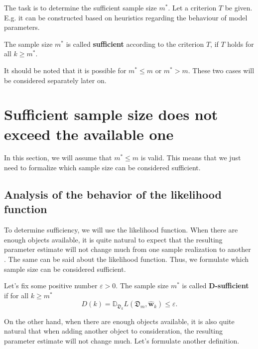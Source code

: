 \documentclass[
11pt,%
tightenlines,%
twoside,%
onecolumn,%
nofloats,%
nobibnotes,%
nofootinbib,%
superscriptaddress,%
noshowpacs,%
centertags]%
{revtex4-2}
\begin{document}
The task is to determine the sufficient sample size $m^*$. Let a criterion $T$ be given. E.g. it can be constructed based on heuristics regarding the behaviour of model parameters.
\begin{definition}
    The sample size $m^*$ is called \textbf{sufficient} according to the criterion $T$, if $T$ holds for all $k \geqslant m^*$.
\end{definition}
It should be noted that it is possible for $m^* \leqslant m$ or $m^* > m$. These two cases will be considered separately later on.

\section{Sufficient sample size does not exceed the available one}\label{sec2}

In this section, we will assume that $m^*\leqslant m$ is valid. This means that we just need to formalize which sample size can be considered sufficient.

\subsection{Analysis of the behavior of the likelihood function}

To determine sufficiency, we will use the likelihood function. When there are enough objects available, it is quite natural to expect that the resulting parameter estimate will not change much from one sample realization to another \cite{Joseph1997, Joseph1995}. The same can be said about the likelihood function. Thus, we formulate which sample size can be considered sufficient.

\begin{definition}
    \label{sufficient-variance}
    Let's fix some positive number $\varepsilon > 0$. The sample size $m^*$ is called \textbf{D-sufficient} if for all $k\geqslant m^*$
    \[ D(k) = \mathbb{D}_{\mathfrak{D}_k} L(\mathfrak{D}_m, \hat{\mathbf{w}}_{k}) \leqslant \varepsilon. \]
\end{definition}

On the other hand, when there are enough objects available, it is also quite natural that when adding another object to consideration, the resulting parameter estimate will not change much. Let's formulate another definition.
\end{document}
